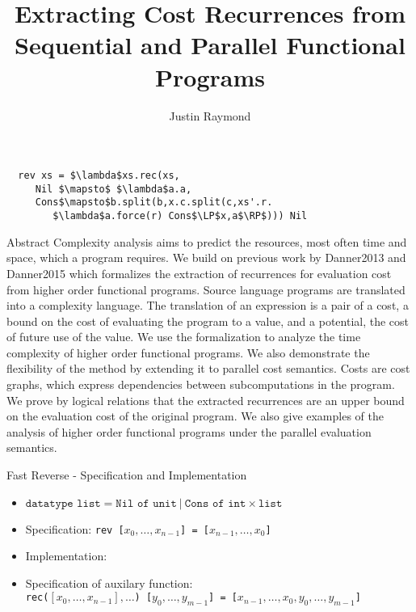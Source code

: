 \documentclass[pdf]{beamer}
\title{Extracting Cost Recurrences from Sequential and Parallel Functional Programs}
\author{Justin Raymond}
\newcommand{\T}[1]{\texttt{#1}}
\newcommand{\LP}{\langle}
\newcommand{\RP}{\rangle}
\begin{document}
\begin{lrbox}{\codebox}
  \begin{lstlisting}
  rev xs = $\lambda$xs.rec(xs,
     Nil $\mapsto$ $\lambda$a.a,
     Cons$\mapsto$b.split(b,x.c.split(c,xs'.r.
        $\lambda$a.force(r) Cons$\LP$x,a$\RP$))) Nil
  \end{lstlisting}
\end{lrbox}

\begin{frame}
  \titlepage
\end{frame}

\begin{frame}{Abstract}
Complexity analysis aims to predict the resources, most often time and space,
which a program requires.  We build on previous work by Danner2013 and
Danner2015 which formalizes the extraction of recurrences for evaluation
cost from higher order functional programs. Source language programs are
translated into a complexity language. The translation of an expression is a
pair of a cost, a bound on the cost of evaluating the program to a value, and a
potential, the cost of future use of the value. We use the formalization to
analyze the time complexity of higher order functional programs. We also
demonstrate the flexibility of the method by extending it to parallel cost
semantics. Costs are cost graphs, which express dependencies between
subcomputations in the program. We prove by logical relations that the
extracted recurrences are an upper bound on the evaluation cost of the original
program. We also give examples of the analysis of higher order functional
programs under the parallel evaluation semantics.
\end{frame}


\begin{frame}{Fast Reverse - Specification and Implementation}
  \begin{itemize}
    \item
        $\T{datatype list} = \T{Nil of unit}\ |\ \T{Cons of int} \times \T{list}$
    \item
      Specification: \T{rev [$x_0,\dots,x_{n-1}$] = [$x_{n-1},\dots,x_0$]}
    \item
      Implementation:
      \usebox{\codebox}
    \item
      Specification of auxilary function:\\
      \T{rec($[x_0,\dots,x_{n-1}],\dots$) [$y_0,\dots,y_{m-1}$] = [$x_{n-1},\dots,x_0,y_0,\dots,y_{m-1}$]}
  \end{itemize}
\end{frame}
\end{document}
